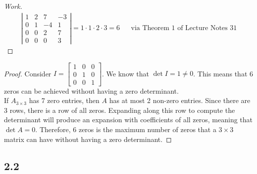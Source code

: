 \documentclass{article}
\begin{document}
\begin{proof}[Work]
    \begin{align*}
        \left\lvert \begin{array}{cccc}
                        1 & 2 & 7  & -3 \\
                        0 & 1 & -4 & 1  \\
                        0 & 0 & 2  & 7  \\
                        0 & 0 & 0  & 3
                    \end{array} \right\rvert = 1 \cdot 1 \cdot 2 \cdot 3 = 6 &  & \text{via Theorem 1 of Lecture Notes 31}
    \end{align*}
\end{proof}
\qdash

\begin{proof}
    Consider $I = \begin{bmatrix}
            1 & 0 & 0 \\
            0 & 1 & 0 \\
            0 & 0 & 1
        \end{bmatrix}$.
    We know that $\det I = 1 \neq 0$. This means that 6 zeros can be achieved without having a zero determinant. \\
    If $A_{3 \times 3}$ has 7 zero entries, then $A$ has at most 2 non-zero entries. Since there are 3 rows, there is a row of all zeros. Expanding along this row to compute the determinant will produce an expansion with coefficients of all zeros, meaning that $\det A = 0$. Therefore, 6 zeros is the maximum number of zeros that a  $3 \times 3$ matrix can have without having a zero determinant.
\end{proof}
\qdash

\subsection*{2.2}
\end{document}
